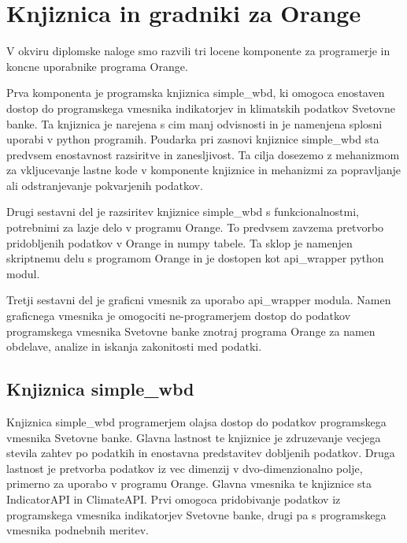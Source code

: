 
\chapter{Knjiznica in gradniki za Orange}

V okviru diplomske naloge smo razvili tri locene komponente za programerje in
koncne uporabnike programa Orange. 

Prva komponenta je programska knjiznica simple\_wbd, ki
omogoca enostaven dostop do programskega vmesnika indikatorjev in klimatskih
podatkov Svetovne banke. Ta knjiznica je narejena s cim manj odvisnosti in je 
namenjena splosni uporabi v python programih. Poudarka pri zasnovi knjiznice 
simple\_wbd sta predvsem enostavnost razsiritve in zanesljivost. Ta cilja
dosezemo z mehanizmom za vkljucevanje lastne kode v komponente knjiznice
in mehanizmi za popravljanje ali odstranjevanje pokvarjenih podatkov.

Drugi sestavni del je razsiritev knjiznice simple\_wbd s funkcionalnostmi, 
potrebnimi za lazje delo v programu Orange. To predvsem zavzema pretvorbo
pridobljenih podatkov v Orange in numpy tabele. Ta sklop je namenjen skriptnemu
delu s programom Orange in je dostopen kot api\_wrapper python modul. 

Tretji sestavni del je graficni vmesnik za uporabo api\_wrapper modula. Namen
graficnega vmesnika je omogociti ne-programerjem dostop do podatkov 
programskega vmesnika Svetovne banke znotraj programa Orange za namen obdelave,
analize in iskanja zakonitosti med podatki.

\section{Knjiznica simple\_wbd}

Knjiznica simple\_wbd programerjem olajsa dostop do podatkov programskega 
vmesnika Svetovne banke. Glavna lastnost te knjiznice je zdruzevanje vecjega 
stevila zahtev po podatkih in enostavna predstavitev dobljenih podatkov. 
Druga lastnost je pretvorba podatkov iz vec dimenzij v dvo-dimenzionalno polje,
primerno za uporabo v programu Orange. Glavna vmesnika te knjiznice sta 
IndicatorAPI in ClimateAPI. Prvi omogoca pridobivanje podatkov iz programskega 
vmesnika indikatorjev Svetovne banke, drugi pa s programskega vmesnika
podnebnih meritev.





